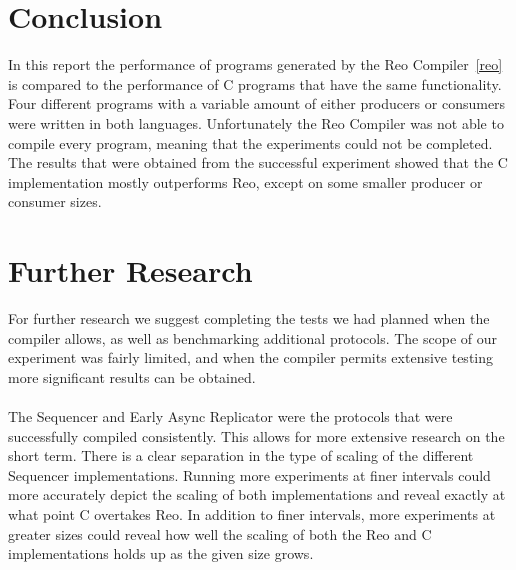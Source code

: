\section{Conclusion}
In this report the performance of programs generated by the Reo Compiler~\ref{reo} is compared to the performance of C programs that have the same functionality. Four different programs with a variable amount of either producers or consumers were written in both languages. Unfortunately the Reo Compiler was not able to compile every program, meaning that the experiments could not be completed. The results that were obtained from the successful experiment showed that the C implementation mostly outperforms Reo, except on some smaller producer or consumer sizes.

\section{Further Research}
For further research we suggest completing the tests we had planned when the compiler allows, as well as benchmarking additional protocols. The scope of our experiment was fairly limited, and when the compiler permits extensive testing more significant results can be obtained.\\\\
%
The Sequencer and Early Async Replicator were the protocols that were successfully compiled consistently. This allows for more extensive research on the short term.
There is a clear separation in the type of scaling of the different Sequencer implementations. Running more experiments at finer intervals could more accurately depict the scaling of both implementations and reveal exactly at what point C overtakes Reo. In addition to finer intervals, more experiments at greater sizes could reveal how well the scaling of both the Reo and C implementations holds up as the given size grows.

